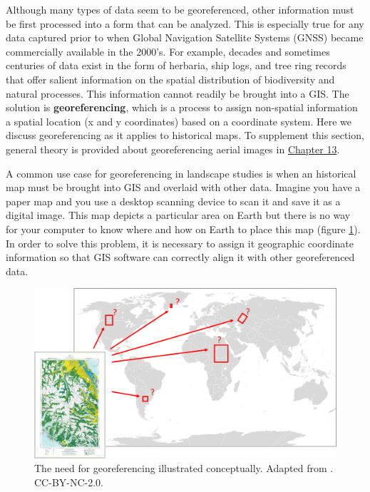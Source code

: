\documentclass[
]{book}
\begin{document}
Although many types of data seem to be georeferenced, other information must be first processed into a form that can be analyzed. This is especially true for any data captured prior to when Global Navigation Satellite Systems (GNSS) became commercially available in the 2000's. For example, decades and sometimes centuries of data exist in the form of herbaria, ship logs, and tree ring records that offer salient information on the spatial distribution of biodiversity and natural processes. This information cannot readily be brought into a GIS. The solution is \textbf{georeferencing}, which is a process to assign non-spatial information a spatial location (x and y coordinates) based on a coordinate system. Here we discuss georeferencing as it applies to historical maps. To supplement this section, general theory is provided about georeferencing aerial images in \href{https://ubc-geomatics-textbook.github.io/geomatics-textbook/image-processing.html}{Chapter 13}.

A common use case for georeferencing in landscape studies is when an historical map must be brought into GIS and overlaid with other data. Imagine you have a paper map and you use a desktop scanning device to scan it and save it as a digital image. This map depicts a particular area on Earth but there is no way for your computer to know where and how on Earth to place this map (figure \ref{fig:4-georeferencing-concept}). In order to solve this problem, it is necessary to assign it geographic coordinate information so that GIS software can correctly align it with other georeferenced data.



\begin{figure}
\includegraphics[width=0.75\linewidth]{images/04-georeferencing-concept} \caption{The need for georeferencing illustrated conceptually. Adapted from \citep{university_of_texas_libraries_intro_2021}. CC-BY-NC-2.0.}\label{fig:4-georeferencing-concept}
\end{figure}
\end{document}
